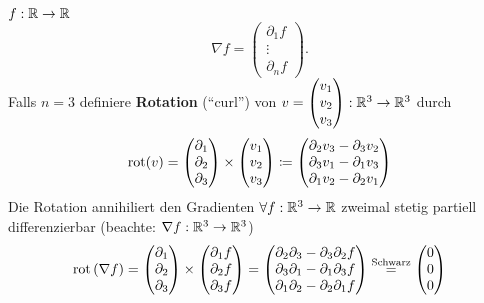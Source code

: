 \begin{example}
	$ f : \mathbb{R} \to \mathbb{R}  $ 
	\[
		\nabla f = \begin{pmatrix} \partial_1 f \\ \vdots \\ \partial_n f \end{pmatrix} .
	\]
	Falls $ n = 3 $ definiere \textbf{Rotation} (``curl'') von $ v = \begin{pmatrix} v_1 \\ v_2 \\ v_3 \end{pmatrix} : \mathbb{R} ^3 \to \mathbb{R} ^3 $ durch
	\[
		\operatorname{rot}(v) = \begin{pmatrix} \partial_1 \\ \partial_2 \\ \partial_3 \end{pmatrix} \times \begin{pmatrix} v_1 \\ v_2 \\ v_3 \end{pmatrix} 
		\coloneqq  \begin{pmatrix}
			\partial_2 v_3 - \partial_3 v_2 \\
			\partial_3 v_1 - \partial_1 v_3 \\
			\partial_1 v_2 - \partial_2 v_1 \\
		\end{pmatrix} 
	\]
	Die Rotation annihiliert den Gradienten  $ \forall f : \mathbb{R} ^3 \to \mathbb{R}  $ zweimal stetig partiell differenzierbar (beachte: $ \nabla f : \mathbb{R} ^3 \to \mathbb{R} ^3 $)
	\[
		\operatorname{rot}\left( \nabla f \right) =
		\begin{pmatrix} 
			\partial_1 \\
			\partial_2 \\
			\partial_3 \\
		\end{pmatrix} 
		\times 
		\begin{pmatrix} 
			\partial_1 f \\
			\partial_2 f \\
			\partial_3 f \\
		\end{pmatrix} 
		=
		\begin{pmatrix} 
			\partial_2 \partial_3 - \partial_3 \partial_2 f \\
			\partial_3 \partial_1 - \partial_1 \partial_3 f \\
			\partial_1 \partial_2 - \partial_2 \partial_1 f \\
		\end{pmatrix} 
		\overset{\text{Schwarz} }{=}
		\begin{pmatrix} 
			0 \\ 0 \\ 0
		\end{pmatrix} 
	\]
\end{example}

